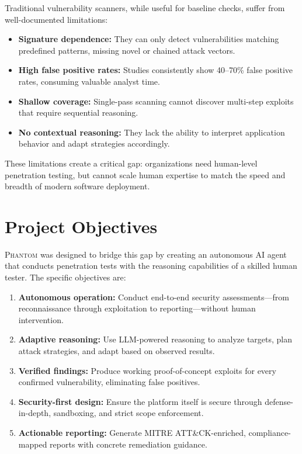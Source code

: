 \documentclass[12pt,a4paper,twoside]{report}
\makeatletter
\newcommand{\phantom@}{\textsc{Phantom}}
\makeatother
\begin{document}
Traditional vulnerability scanners, while useful for baseline checks, suffer from well-documented limitations:
\begin{itemize}
    \item \textbf{Signature dependence:} They can only detect vulnerabilities matching predefined patterns, missing novel or chained attack vectors.
    \item \textbf{High false positive rates:} Studies consistently show 40--70\% false positive rates, consuming valuable analyst time.
    \item \textbf{Shallow coverage:} Single-pass scanning cannot discover multi-step exploits that require sequential reasoning.
    \item \textbf{No contextual reasoning:} They lack the ability to interpret application behavior and adapt strategies accordingly.
\end{itemize}

These limitations create a critical gap: organizations need human-level penetration testing, but cannot scale human expertise to match the speed and breadth of modern software deployment.

\section{Project Objectives}

\phantom@{} was designed to bridge this gap by creating an autonomous AI agent that conducts penetration tests with the reasoning capabilities of a skilled human tester. The specific objectives are:

\begin{enumerate}
    \item \textbf{Autonomous operation:} Conduct end-to-end security assessments---from reconnaissance through exploitation to reporting---without human intervention.
    \item \textbf{Adaptive reasoning:} Use LLM-powered reasoning to analyze targets, plan attack strategies, and adapt based on observed results.
    \item \textbf{Verified findings:} Produce working proof-of-concept exploits for every confirmed vulnerability, eliminating false positives.
    \item \textbf{Security-first design:} Ensure the platform itself is secure through defense-in-depth, sandboxing, and strict scope enforcement.
    \item \textbf{Actionable reporting:} Generate MITRE ATT\&CK-enriched, compliance-mapped reports with concrete remediation guidance.
\end{enumerate}
\end{document}
